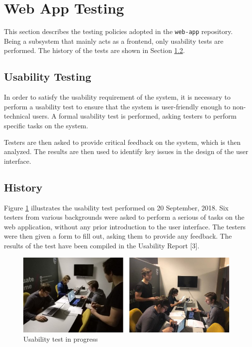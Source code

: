 \documentclass{article}
\begin{document}
    \newpage


    \section{Web App Testing}
    \label{sec:web-app}

    This section describes the testing policies adopted in the \texttt{web-app}
    repository. Being a subsystem that mainly acts as a frontend, only
    usability tests are performed. The history of the tests are shown in
    Section \ref{sec:wa-hist}.

    \subsection{Usability Testing}
    \label{sec:wa-tools}

    In order to satisfy the usability requirement of the system, it is
    necessary to perform a usability test to ensure that the system is
    user-friendly enough to non-technical users. A formal usability test is
    performed, asking testers to perform specific tasks on the system.
    
    Testers are then asked to provide critical feedback on the system, which is
    then analyzed. The results are then used to identify key issues in the
    design of the user interface.

    \subsection{History}
    \label{sec:wa-hist}

    Figure \ref{fig:usability} illustrates the usability test performed on 20
    September, 2018. Six testers from various backgrounds were asked to perform
    a serious of tasks on the web application, without any prior introduction
    to the user interface. The testers were then given a form to fill out,
    asking them to provide any feedback. The results of the test have been compiled
    in the Usability Report [3].

    \begin{figure}[H]
        \centering
        \includegraphics[scale=0.55]{UsabilityTest}
        \caption{Usability test in progress}
        \label{fig:usability}
    \end{figure}
\end{document}
